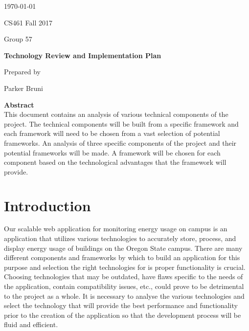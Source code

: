 \documentclass[onecolumn, draftclsnofoot,10pt, compsoc]{IEEEtran}
\newcommand{\NameSigPair}[1]{\par
\makebox[2.75in][r]{#1} \hfil 	\makebox[3.25in]{\makebox[2.25in]{\hrulefill} \hfill		\makebox[.75in]{\hrulefill}}
\par\vspace{-12pt} \textit{\tiny\noindent
\makebox[2.75in]{} \hfil		\makebox[3.25in]{\makebox[2.25in][r]{Signature} \hfill	\makebox[.75in][r]{Date}}}}
\renewcommand{\NameSigPair}[1]{#1}
\begin{document}
\begin{titlepage}
    \begin{singlespace}
        \hfill 
        \par\vspace{.2in}
        \centering
        \scshape{
            {\large\today}\par
			{\large CS461 Fall 2017}\par
			{\large Group 57}\par
            \vspace{2.5in}
            \textbf{\Huge{Technology Review and Implementation Plan}}\par
			\textbf{\Huge{}}\par
            \vspace{2.5in}
            {\large Prepared by }\par
            \vspace{5pt}
            {\Large
                \NameSigPair{Parker Bruni}\par
			\vfill
			\textbf{Abstract} \\
            \indent 
				This document contains an analysis of various technical components of the project. The technical components will be built from a specific 
				framework and each framework will need to be chosen from a vast selection of potential frameworks. An analysis of three specific components
				of the project and their potential frameworks will be made. A framework will be chosen for each component based on the 
				technological advantages that the framework will provide. 
            }
            \vspace{20pt}
        }
      
    \end{singlespace}
\end{titlepage}
\newpage
{}


\section{Introduction}
	
	Our scalable web application for monitoring energy usage on campus is an application that utilizes various technologies to accurately store, process, and display
	energy usage of buildings on the Oregon State campus. There are many different components and frameworks by which to build an application for this purpose and
	selection the right technologies for is proper functionality is crucial. Choosing technologies that may be outdated, have flaws specific to the needs of the application, contain
	compatibility issues, etc., could prove to be detrimental to the project as a whole. It is necessary to analyse the various technologies and select
	the technology that will provide the best performance and functionality prior to the creation of the application so that the development process will be fluid and efficient. 
	
\end{document}
